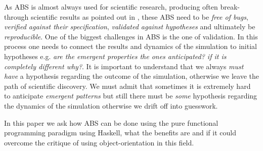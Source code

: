 As ABS is almost always used for scientific research, producing often break-through scientific results as pointed out in \cite{axelrod_chapter_2006}, these ABS need to be \textit{free of bugs}, \textit{verified against their specification}, \textit{validated against hypotheses} and ultimately be \textit{reproducible}. One of the biggest challenges in ABS is the one of validation. In this process one needs to connect the results and dynamics of the simulation to initial hypotheses e.g. \textit{are the emergent properties the ones anticipated? if it is completely different why?}. It is important to understand that we always \textit{must have} a hypothesis regarding the outcome of the simulation, otherwise we leave the path of scientific discovery. We must admit that sometimes it is extremely hard to anticipate \textit{emergent patterns} but still there must be \textit{some} hypothesis regarding the dynamics of the simulation otherwise we drift off into guesswork.

In this paper we ask how ABS can be done using the pure functional programming paradigm using Haskell, what the benefits are and if it could overcome the critique of using object-orientation in this field.